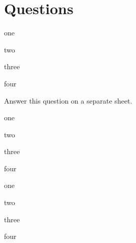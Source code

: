 \documentclass{scrartcl}
\newcommand*\choice{\item}
\begin{document}
\section{Questions}
\begin{multiplechoice}[choices=1]
  \choice one
  \choice two
  \choice three
  \choice four
\end{multiplechoice}

\begin{exercise}
  Answer this question on a separate sheet.  
\end{exercise}

\begin{multiplechoice}[multiple]
  \choice one
  \choice two
  \choice three
  \choice four
\end{multiplechoice}

\begin{multiplechoice}[choices=2]
  \choice one
  \choice two
  \choice three
  \choice four
\end{multiplechoice}
\end{document}
